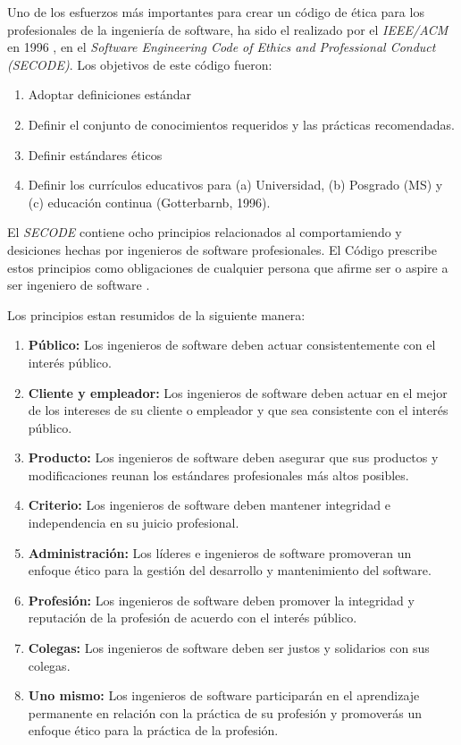 \documentclass[twoside]{article}
\begin{document}
\begin{multicols}{2}
Uno de los esfuerzos más importantes para crear un código de ética para los
profesionales de la ingeniería de software, ha sido el realizado por el
\textit{IEEE/ACM} en 1996 \cite{gotterbarn2001software}, en el \textit{Software
Engineering Code of Ethics and Professional Conduct (SECODE)}. Los objetivos de este
código fueron:

\begin{enumerate}
    \item Adoptar definiciones estándar
    \item Definir el conjunto de conocimientos requeridos y las prácticas recomendadas.
    \item Definir estándares éticos
    \item Definir los currículos educativos para (a) Universidad, (b) Posgrado (MS) y (c)
educación continua (Gotterbarnb, 1996).
\end{enumerate}

El \textit{SECODE} contiene ocho principios relacionados al comportamiendo y
desiciones hechas por ingenieros de software profesionales. El Código prescribe
estos principios como obligaciones de cualquier persona que afirme ser o aspire
a ser ingeniero de software \cite{vallor2015introduction}.

Los principios estan resumidos de la siguiente manera:

\begin{enumerate}
\item \textbf{Público:} Los ingenieros de software deben actuar consistentemente
con el interés público.
\item \textbf{Cliente y empleador:} Los ingenieros de software deben actuar en
el mejor de los intereses de su cliente o empleador y que sea consistente con el
interés público.
\item \textbf{Producto:} Los ingenieros de software deben asegurar que sus
productos y modificaciones reunan los estándares profesionales más altos
posibles.
\item \textbf{Criterio:} Los ingenieros de software deben mantener integridad e
independencia en su juicio profesional.
\item \textbf{Administración:} Los líderes e ingenieros de software promoveran
un enfoque ético para la gestión del desarrollo y mantenimiento del software.
\item \textbf{Profesión:} Los ingenieros de software deben promover la
integridad y reputación de la profesión de acuerdo con el interés público.
\item \textbf{Colegas:} Los ingenieros de software deben ser justos y solidarios
con sus colegas.
\item \textbf{Uno mismo:} Los ingenieros de software participarán en el
aprendizaje permanente en relación con la práctica de su profesión y promoverás
un enfoque ético para la práctica de la profesión.
\end{enumerate}



\end{multicols}
\end{document}
